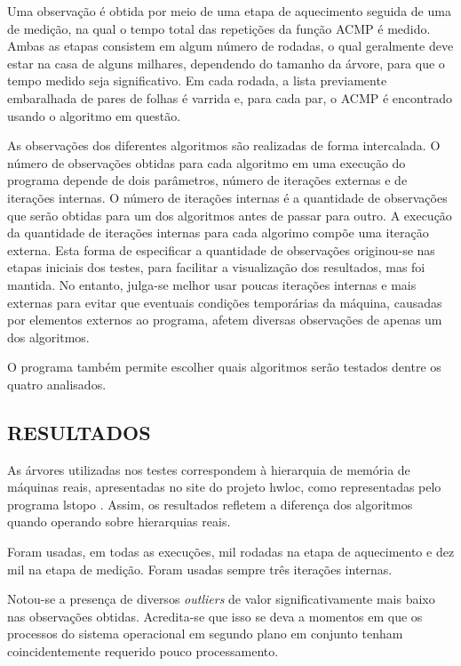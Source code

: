 Uma observação é obtida por meio de uma etapa de aquecimento seguida de uma de medição, na qual o tempo total das repetições da função ACMP é medido.
Ambas as etapas consistem em algum número de rodadas, o qual geralmente deve estar na casa de alguns milhares, dependendo do tamanho da árvore, para que o tempo medido seja significativo.
Em cada rodada, a lista previamente embaralhada de pares de folhas é varrida e, para cada par, o ACMP é encontrado usando o algoritmo em questão.

As observações dos diferentes algoritmos são realizadas de forma intercalada.
O número de observações obtidas para cada algoritmo em uma execução do programa depende de dois parâmetros, número de iterações externas e de iterações internas.
O número de iterações internas é a quantidade de observações que serão obtidas para um dos algoritmos antes de passar para outro.
A execução da quantidade de iterações internas para cada algorimo compõe uma iteração externa.
Esta forma de especificar a quantidade de observações originou-se nas etapas iniciais dos testes, para facilitar a visualização dos resultados, mas foi mantida.
No entanto, julga-se melhor usar poucas iterações internas e mais externas para evitar que eventuais condições temporárias da máquina, causadas por elementos externos ao programa, afetem diversas observações de apenas um dos algoritmos.

O programa também permite escolher quais algoritmos serão testados dentre os quatro analisados.



\subsection{RESULTADOS}

As árvores utilizadas nos testes correspondem à hierarquia de memória de máquinas reais, apresentadas no site do projeto hwloc, como representadas pelo programa lstopo \cite{lstopo}.
Assim, os resultados refletem a diferença dos algoritmos quando operando sobre hierarquias reais.

Foram usadas, em todas as execuções, mil rodadas na etapa de aquecimento e dez mil na etapa de medição.
Foram usadas sempre três iterações internas.

Notou-se a presença de diversos \textit{outliers} de valor significativamente mais baixo nas observações obtidas.
Acredita-se que isso se deva a momentos em que os processos do sistema operacional em segundo plano em conjunto tenham coincidentemente requerido pouco processamento.

